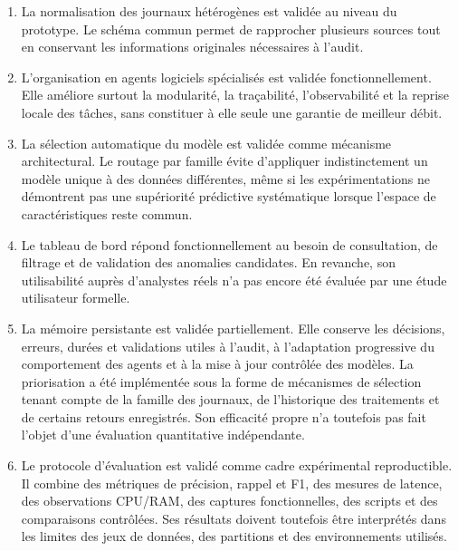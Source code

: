 \begin{enumerate}

\item La normalisation des journaux hétérogènes est validée au niveau du prototype. Le schéma commun permet de rapprocher plusieurs sources tout en conservant les informations originales nécessaires à l'audit.

\item L'organisation en agents logiciels spécialisés est validée fonctionnellement. Elle améliore surtout la modularité, la traçabilité, l'observabilité et la reprise locale des tâches, sans constituer à elle seule une garantie de meilleur débit.

\item La sélection automatique du modèle est validée comme mécanisme architectural. Le routage par famille évite d'appliquer indistinctement un modèle unique à des données différentes, même si les expérimentations ne démontrent pas une supériorité prédictive systématique lorsque l'espace de caractéristiques reste commun.

\item Le tableau de bord répond fonctionnellement au besoin de consultation, de filtrage et de validation des anomalies candidates. En revanche, son utilisabilité auprès d'analystes réels n'a pas encore été évaluée par une étude utilisateur formelle.

\item La mémoire persistante est validée partiellement. Elle conserve les décisions, erreurs, durées et validations utiles à l'audit, à l'adaptation progressive du comportement des agents et à la mise à jour contrôlée des modèles. La priorisation a été implémentée sous la forme de mécanismes de sélection tenant compte de la famille des journaux, de l'historique des traitements et de certains retours enregistrés. Son efficacité propre n'a toutefois pas fait l'objet d'une évaluation quantitative indépendante.

\item Le protocole d'évaluation est validé comme cadre expérimental reproductible. Il combine des métriques de précision, rappel et F1, des mesures de latence, des observations CPU/RAM, des captures fonctionnelles, des scripts et des comparaisons contrôlées. Ses résultats doivent toutefois être interprétés dans les limites des jeux de données, des partitions et des environnements utilisés.

\end{enumerate}


